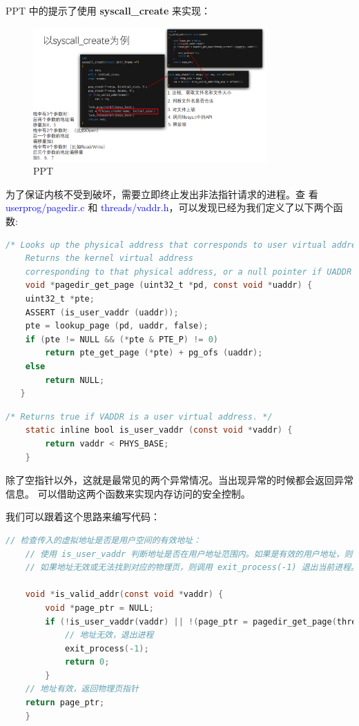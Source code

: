 \documentclass[14pt,a4paper,UTF8,twoside]{article}
\renewcommand{\texttt}[1]{\textcolor{blue}{\ttfamily #1}}
\begin{document}
PPT 中的提示了使用 \textbf{syscall\_create} 来实现：

\begin{figure}[H]
    \centering
    \includegraphics[width=0.8\textwidth]{img5/ppt.png}
    \caption{PPT}
    \label{fig:check}
\end{figure}

为了保证内核不受到破坏，需要立即终止发出非法指针请求的进程。查
看 \texttt{userprog/pagedir.c} 和 \texttt{threads/vaddr.h}，可以发现已经为我们定义了以下两个函数:

\begin{lstlisting}[language=C,title= pagedir\_get\_page()]
    /* Looks up the physical address that corresponds to user virtual address UADDR in PD.
    Returns the kernel virtual address
    corresponding to that physical address, or a null pointer if UADDR is unmapped. */
    void *pagedir_get_page (uint32_t *pd, const void *uaddr) {
    uint32_t *pte;
    ASSERT (is_user_vaddr (uaddr));
    pte = lookup_page (pd, uaddr, false);
    if (pte != NULL && (*pte & PTE_P) != 0)
        return pte_get_page (*pte) + pg_ofs (uaddr);
    else
        return NULL;
   }
\end{lstlisting}

\begin{lstlisting}[language=C,title= is\_user\_vaddr()]
    /* Returns true if VADDR is a user virtual address. */
    static inline bool is_user_vaddr (const void *vaddr) {
        return vaddr < PHYS_BASE;
    }
\end{lstlisting}

除了空指针以外，这就是最常见的两个异常情况。当出现异常的时候都会返回异常信息。
可以借助这两个函数来实现内存访问的安全控制。

我们可以跟着这个思路来编写代码：

\begin{lstlisting}[language=C, title= syscall\_create()]
    // 检查传入的虚拟地址是否是用户空间的有效地址：
    // 使用 is_user_vaddr 判断地址是否在用户地址范围内。如果是有效的用户地址，则使用 pagedir_get_page 从当前线程的页目录中获取该虚拟地址对应的物理页指针。
    // 如果地址无效或无法找到对应的物理页，则调用 exit_process(-1) 退出当前进程。

    void *is_valid_addr(const void *vaddr) {
        void *page_ptr = NULL;
        if (!is_user_vaddr(vaddr) || !(page_ptr = pagedir_get_page(thread_current()->pagedir, vaddr))) {
            // 地址无效，退出进程
            exit_process(-1);
            return 0;
        }
    // 地址有效，返回物理页指针
    return page_ptr;
    }
\end{lstlisting}
\end{document}
